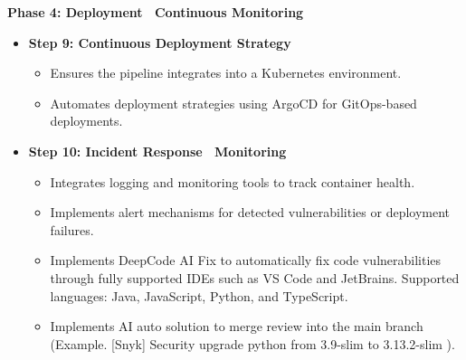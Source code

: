 \documentclass[conference]{IEEEtran}
\begin{document}
\textbf{Phase 4: Deployment \ Continuous Monitoring}
\begin{itemize}
\item \textbf{Step 9: Continuous Deployment Strategy}
\begin{itemize}
\item Ensures the pipeline integrates into a Kubernetes environment.
\item Automates deployment strategies using ArgoCD for GitOps-based deployments.
\end{itemize}
\item \textbf{Step 10: Incident Response \ Monitoring}
\begin{itemize}
\item Integrates logging and monitoring tools to track container health.
\item Implements alert mechanisms for detected vulnerabilities or deployment failures.
\item Implements DeepCode AI Fix to automatically fix code vulnerabilities through fully supported IDEs such as VS Code and JetBrains. Supported languages: Java, JavaScript, Python, and TypeScript.
\item Implements AI auto solution to merge review into the main branch (Example. [Snyk] Security upgrade python from 3.9-slim to 3.13.2-slim  
).
\end{itemize}
\end{itemize}
\end{document}
